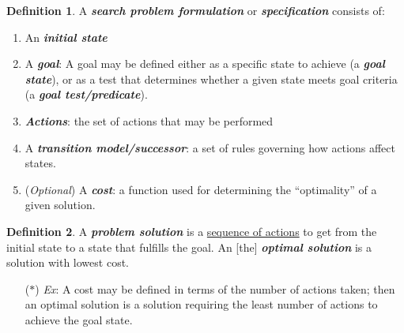 \documentclass[12pt]{extarticle}
\theoremstyle{definition}
\newtheorem*{definition}{Definition}
\theoremstyle{remark}
\newcommand{\term}[1]{\noindent\textbf{\textit{#1}}}
\begin{document}
\vspace{5pt}
\begin{tcolorbox}[colback=red!50!blue!10!white]
    \begin{definition}
    A \term{search problem formulation} or \term{specification} consists of:
    \begin{enumerate}
        \item An \term{initial state}
        \item A \term{goal}: A goal may be defined either as a specific state to achieve (a \term{goal state}), or as a test that determines whether a given state meets goal criteria (a \term{goal test/predicate}).
        \item \term{Actions}: the set of actions that may be performed
        \item A \term{transition model/successor}: a set of rules governing how actions affect states.
        \item (\textit{Optional}) A \term{cost}: a function used for determining the “optimality” of a given solution.
    \end{enumerate}
\end{definition}
\end{tcolorbox}

\begin{tcolorbox}[colback=orange!15!white]
    \begin{definition}
    A \term{problem solution} is a \ul{sequence of actions} to get from the initial state to a state that fulfills the goal. An [the] \term{optimal solution} is a solution with lowest cost.\begin{itemize}
        \item[($\ast$)] \textit{Ex}: A cost may be defined in terms of the number of actions taken; then an optimal solution is a solution requiring the least number of actions to achieve the goal state.
    \end{itemize}
\end{definition}
\end{tcolorbox}
\end{document}
